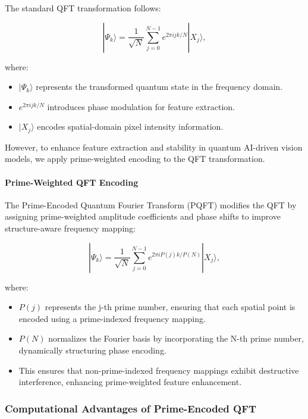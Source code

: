 \documentclass{article}
\theoremstyle{plain}
\begin{document}
\begin{itemize}
\begin{itemize}
The standard QFT transformation follows:

\begin{equation}
|\Psi_k\rangle = \frac{1}{\sqrt{N}} \sum_{j=0}^{N-1} e^{2\pi i jk / N} |X_j\rangle,
\end{equation}

where:
\begin{itemize}
    \item $|\Psi_k\rangle$ represents the transformed quantum state in the frequency domain.
    \item $e^{2\pi i jk / N}$ introduces phase modulation for feature extraction.
    \item $|X_j\rangle$ encodes spatial-domain pixel intensity information.
\end{itemize}

However, to enhance feature extraction and stability in quantum AI-driven vision models, we apply prime-weighted encoding to the QFT transformation.

\paragraph{Prime-Weighted QFT Encoding}

The Prime-Encoded Quantum Fourier Transform (PQFT) modifies the QFT by assigning prime-weighted amplitude coefficients and phase shifts to improve structure-aware frequency mapping:

\begin{equation}
|\Psi_k\rangle = \frac{1}{\sqrt{N}} \sum_{j=0}^{N-1} e^{2\pi i P(j)k / P(N)} |X_j\rangle,
\end{equation}

where:
\begin{itemize}
    \item $P(j)$ represents the j-th prime number, ensuring that each spatial point is encoded using a prime-indexed frequency mapping.
    \item $P(N)$ normalizes the Fourier basis by incorporating the N-th prime number, dynamically structuring phase encoding.
    \item This ensures that non-prime-indexed frequency mappings exhibit destructive interference, enhancing prime-weighted feature enhancement.
\end{itemize}

\subsubsection{Computational Advantages of Prime-Encoded QFT}


\end{itemize}
\end{itemize}
\end{document}
